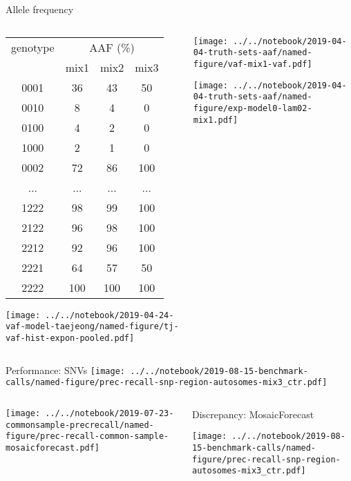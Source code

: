 \documentclass{beamer}
\begin{document}
\begin{frame}{Allele frequency}
\begin{columns}[t]
\begin{column}{0.5\textwidth}
{\tiny
\begin{tabular}{c|ccc}
genotype & \multicolumn{3}{c}{AAF (\%)} \\
& mix1 &  mix2 & mix3 \\
\hline
0001 & 36 & 43 & 50\\
0010 & 8 & 4 & 0\\
0100 & 4 & 2 & 0\\
1000 & 2 & 1 & 0\\
0002 & 72 & 86 & 100\\
... & ... & ... & ...\\
1222 & 98 & 99 & 100\\
2122 & 96 & 98 & 100\\
2212 & 92 & 96 & 100\\
2221 & 64 & 57 & 50\\
2222 & 100 & 100 & 100\\
\end{tabular}
}

\texttt{[image: ../../notebook/2019-04-24-vaf-model-taejeong/named-figure/tj-vaf-hist-expon-pooled.pdf]}
\end{column}

\begin{column}{0.5\textwidth}

\texttt{[image: ../../notebook/2019-04-04-truth-sets-aaf/named-figure/vaf-mix1-vaf.pdf]}

\texttt{[image: ../../notebook/2019-04-04-truth-sets-aaf/named-figure/exp-model0-lam02-mix1.pdf]}
\end{column}
\end{columns}
\end{frame}

\begin{frame}{Performance: SNVs}
\texttt{[image: ../../notebook/2019-08-15-benchmark-calls/named-figure/prec-recall-snp-region-autosomes-mix3\_ctr.pdf]}
\end{frame}

\begin{frame}
\begin{columns}[t]
\begin{column}{0.5\textwidth}

\texttt{[image: ../../notebook/2019-07-23-commonsample-precrecall/named-figure/prec-recall-common-sample-mosaicforecast.pdf]}
\end{column}

\begin{column}{0.5\textwidth}{Discrepancy: MosaicForecast}

\texttt{[image: ../../notebook/2019-08-15-benchmark-calls/named-figure/prec-recall-snp-region-autosomes-mix3\_ctr.pdf]}
\end{column}
\end{columns}
\end{frame}
\end{document}
